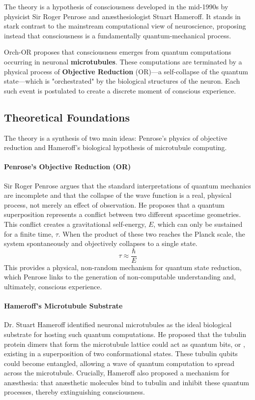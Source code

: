 The  theory is a hypothesis of consciousness developed in the mid-1990s by physicist Sir Roger Penrose and anæsthesiologist Stuart Hameroff. It stands in stark contrast to the mainstream computational view of neuroscience, proposing instead that consciousness is a fundamentally quantum-mechanical process.

\begin{keyconcept}
    Orch-OR proposes that consciousness emerges from quantum computations occurring in neuronal \textbf{microtubules}. These computations are terminated by a physical process of \textbf{Objective Reduction} (OR)—a self-collapse of the quantum state—which is "orchestrated" by the biological structures of the neuron. Each such event is postulated to create a discrete moment of conscious experience.
\end{keyconcept}

\subsection{Theoretical Foundations}

The theory is a synthesis of two main ideas: Penrose's physics of objective reduction and Hameroff's biological hypothesis of microtubule computing.

\paragraph{Penrose's Objective Reduction (OR)}
Sir Roger Penrose argues that the standard interpretations of quantum mechanics are incomplete and that the collapse of the wave function is a real, physical process, not merely an effect of observation. He proposes that a quantum superposition represents a conflict between two different spacetime geometries. This conflict creates a gravitational self-energy, \(E\), which can only be sustained for a finite time, \(\tau\). When the product of these two reaches the Planck scale, the system spontaneously and objectively collapses to a single state.
\begin{equation}
\label{eq:or-criterion}
\tau \approx \frac{\hbar}{E}
\end{equation}
This provides a physical, non-random mechanism for quantum state reduction, which Penrose links to the generation of non-computable understanding and, ultimately, conscious experience.

\paragraph{Hameroff's Microtubule Substrate}
Dr. Stuart Hameroff identified neuronal microtubules as the ideal biological substrate for hosting such quantum computations. He proposed that the tubulin protein dimers that form the microtubule lattice could act as quantum bits, or , existing in a superposition of two conformational states. These tubulin qubits could become entangled, allowing a wave of quantum computation to spread across the microtubule. Crucially, Hameroff also proposed a mechanism for anæsthesia: that anæsthetic molecules bind to tubulin and inhibit these quantum processes, thereby extinguishing consciousness.

